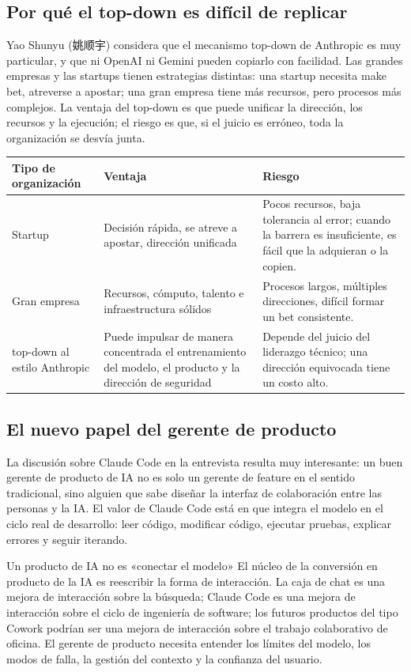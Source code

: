 \subsection{Por qué el top-down es difícil de replicar}

Yao Shunyu (姚顺宇) considera que el mecanismo top-down de Anthropic es muy particular, y que ni OpenAI ni Gemini pueden copiarlo con facilidad. Las grandes empresas y las startups tienen estrategias distintas: una startup necesita make bet, atreverse a apostar; una gran empresa tiene más recursos, pero procesos más complejos. La ventaja del top-down es que puede unificar la dirección, los recursos y la ejecución; el riesgo es que, si el juicio es erróneo, toda la organización se desvía junta.

\noindent\begin{tabularx}{\textwidth}{p{}p{}X}
\toprule
Tipo de organización & Ventaja & Riesgo \\
\midrule
Startup & Decisión rápida, se atreve a apostar, dirección unificada & Pocos recursos, baja tolerancia al error; cuando la barrera es insuficiente, es fácil que la adquieran o la copien. \\
Gran empresa & Recursos, cómputo, talento e infraestructura sólidos & Procesos largos, múltiples direcciones, difícil formar un bet consistente. \\
top-down al estilo Anthropic & Puede impulsar de manera concentrada el entrenamiento del modelo, el producto y la dirección de seguridad & Depende del juicio del liderazgo técnico; una dirección equivocada tiene un costo alto. \\
\bottomrule
\end{tabularx}

\subsection{El nuevo papel del gerente de producto}

La discusión sobre Claude Code en la entrevista resulta muy interesante: un buen gerente de producto de IA no es solo un gerente de feature en el sentido tradicional, sino alguien que sabe diseñar la interfaz de colaboración entre las personas y la IA. El valor de Claude Code está en que integra el modelo en el ciclo real de desarrollo: leer código, modificar código, ejecutar pruebas, explicar errores y seguir iterando.

\begin{knowledgebox}{Un producto de IA no es «conectar el modelo»}
El núcleo de la conversión en producto de la IA es reescribir la forma de interacción. La caja de chat es una mejora de interacción sobre la búsqueda; Claude Code es una mejora de interacción sobre el ciclo de ingeniería de software; los futuros productos del tipo Cowork podrían ser una mejora de interacción sobre el trabajo colaborativo de oficina. El gerente de producto necesita entender los límites del modelo, los modos de falla, la gestión del contexto y la confianza del usuario.
\end{knowledgebox}

